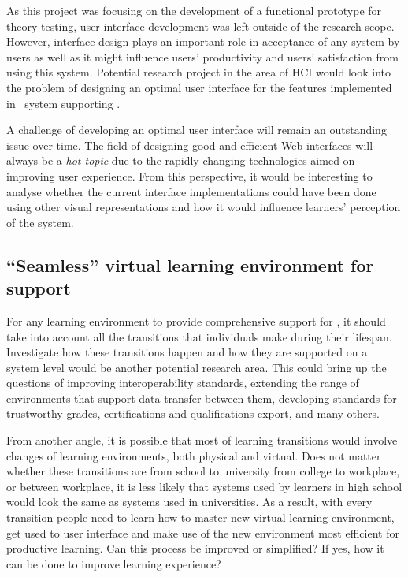 As this project was focusing on the development of a functional prototype for
theory testing, user interface development was left outside of the research
scope. However, interface design plays an important role in acceptance of any
system by users as well as it might influence users' productivity and users'
satisfaction from using this system. Potential research project in the area of
HCI would look into the problem of designing an optimal user interface for the
features implemented in \ep~system supporting \LLLsn. 

A challenge of developing an optimal user interface will remain an outstanding
issue over time. The field of designing good and efficient Web interfaces will
always be a \textit{hot topic} due to the rapidly changing technologies aimed on
improving user experience. From this perspective, it would be interesting to
analyse whether the current interface implementations could have been done using
other visual representations and how it would influence learners' perception of
the system.

\subsection[``Seamless'' environment for \LLLs support]{``Seamless'' virtual
learning environment for \LLLs support} 
For any learning environment to provide comprehensive support for \LLLs, it should take into account all the transitions that individuals make during their
lifespan. Investigate how these transitions happen and how they are supported on
a system level would be another potential research area. This could bring up the
questions of improving interoperability standards, extending the range of
environments that support data transfer between them, developing standards for
trustworthy grades, certifications and qualifications export, and many others.

From another angle, it is possible that most of learning transitions would
involve changes of learning environments, both physical and virtual. Does not
matter whether these transitions are from school to university from college to
workplace, or between workplace, it is less likely that systems used by learners
in high school would look the same as systems used in universities. As a result,
with every transition people need to learn how to master new virtual learning
environment, get used to user interface and make use of the new environment most
efficient for productive learning. Can this process be improved or simplified?
If yes, how it can be done to improve learning experience?

